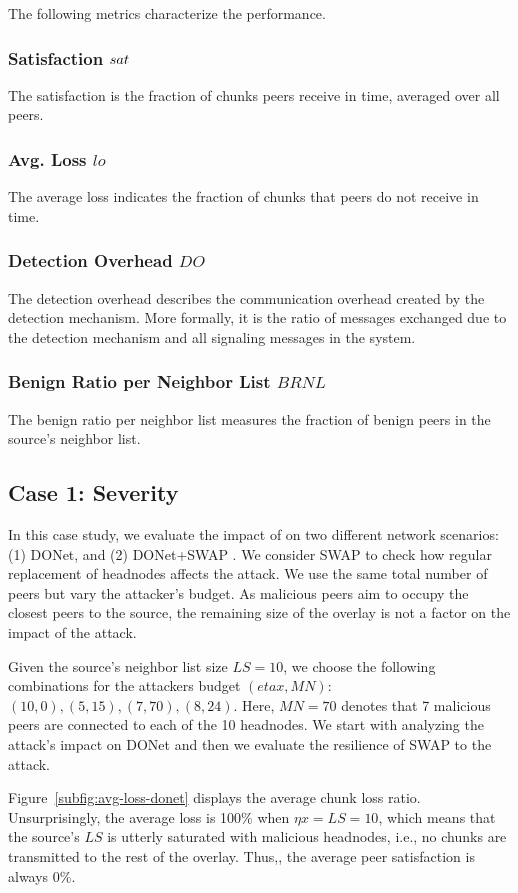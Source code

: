 The following metrics characterize the performance.
\subsubsection*{Satisfaction $sat$} The satisfaction is the fraction of chunks peers receive in time, averaged over all peers. 
\subsubsection*{Avg. Loss $lo$} The average loss indicates the fraction of chunks that peers do not receive in time. 
\subsubsection*{Detection Overhead $DO$} The detection overhead describes the communication overhead created by the detection mechanism. More formally, it is the ratio of messages exchanged due to the detection mechanism and all signaling messages in the system.
\subsubsection*{Benign Ratio per Neighbor List $BRNL$} The benign ratio per neighbor list measures the fraction of benign peers in the source's neighbor list.

\subsection{Case 1: \drop Severity}

In this case study, we evaluate the impact of \drop on two different network scenarios:  (1) DONet, and (2) DONet+SWAP \cite{nguyen2016swap}. We consider SWAP to check how regular replacement of headnodes affects the attack. 
We use the same total number of peers but vary the attacker's budget.
As malicious peers aim to occupy the closest peers to the source, the remaining size of the overlay is not a factor on the impact of the \drop attack.

Given the source's neighbor list size $LS=10$, we choose the following combinations for the attackers budget $(eta x, MN)$: $(10,0), (5,15), (7,70), (8,24)$.
Here, $MN=70$ denotes that 7 malicious peers are connected to each of the 10 headnodes.
We start with analyzing the attack's impact on DONet and then we evaluate the resilience of SWAP to the attack.

Figure~\ref{subfig:avg-loss-donet} displays the average chunk loss ratio.
Unsurprisingly, the average loss is 100\% when $\eta x= LS =10$, which means that the source's $LS$ is utterly saturated with malicious headnodes, i.e., no chunks are transmitted to the rest of the overlay.
Thus,, the average peer satisfaction is always 0\%. 

